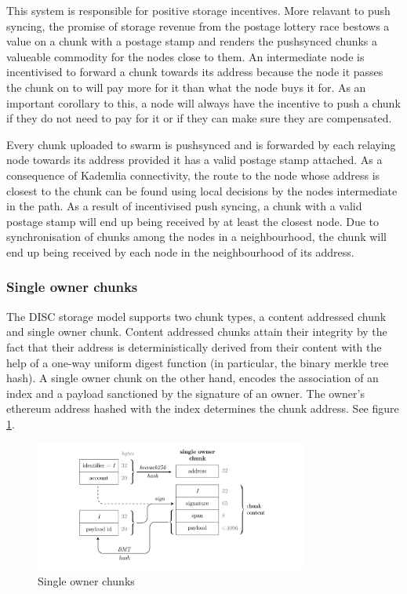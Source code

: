 This system is responsible for positive storage incentives. More relavant to push syncing, the promise of storage revenue from the postage lottery race bestows a value on a chunk with a postage stamp and renders the pushsynced chunks a valueable commodity for the nodes close to them.
An intermediate node is incentivised to forward a chunk towards its address because the node it passes the chunk on to will pay more for it than what the node buys it for. As an important corollary to this, a node will always have the incentive to push a chunk if they do not need to pay for it or if they can make sure they are compensated.

\begin{lemma}
\label{lem:pushsync}
Every chunk uploaded to swarm is pushsynced and is forwarded by each relaying node towards its address  provided it has a valid postage stamp attached. As a consequence of Kademlia connectivity, the route to the node whose address is closest to the chunk can be found using local decisions by the nodes intermediate in the path. As a result of incentivised push syncing, a chunk with a valid postage stamp will end up being received by at least the closest node. Due to synchronisation of chunks among the nodes in a neighbourhood, the chunk will end up being received by each node in the neighbourhood of its address.
\end{lemma}

\subsubsection{Single owner chunks}

The DISC storage model supports two chunk types, a content addressed chunk and  single owner chunk. Content addressed chunks attain their integrity by the fact that their address is deterministically derived from their content with the help of a one-way uniform digest function (in particular, the binary  merkle tree hash). A single owner chunk on the other hand, encodes the association of an index and a payload sanctioned by the signature of an owner. The owner's ethereum address hashed with the index determines the chunk address. See figure \ref{fig:soc}. 

\begin{figure}[htbp]
  \centering
    \includegraphics[width=0.8\textwidth]{figs/single-owner-chunk.pdf}
  \caption{Single owner chunks}
\label{fig:soc}
\end{figure}

